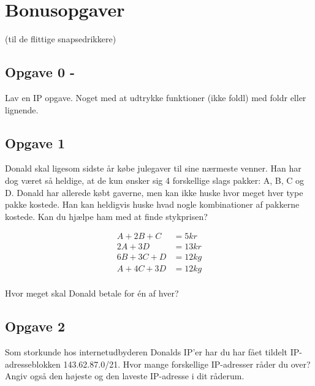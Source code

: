 \section{\huge{Bonusopgaver}}
(til de flittige snapsedrikkere)


\subsection{Opgave 0 - \color{red}{TODO!}}

Lav en IP opgave. Noget med at udtrykke funktioner (ikke foldl) med foldr
eller lignende.



\subsection{Opgave 1}
Donald skal ligesom sidste år købe julegaver til sine nærmeste venner.
Han har dog været så heldige, at de kun ønsker sig 4 forskellige slags pakker:
A, B, C og D. Donald har allerede købt gaverne, men kan ikke huske hvor meget
hver type pakke kostede. Han kan heldigvis huske hvad nogle kombinationer
af pakkerne kostede. Kan du hjælpe ham med at finde stykprisen?

\begin{align*}
A + 2B + C &= 5kr \\
2A + 3D &= 13kr \\
6B + 3C + D &= 12kg \\
A + 4C + 3D &= 12kg \\
\end{align*}

Hvor meget skal Donald betale for én af hver?



\subsection{Opgave 2}
Som storkunde hos internetudbyderen Donalds IP'er har du har fået tildelt
IP-adresseblokken 143.62.87.0/21. Hvor mange forskellige IP-adresser råder du
over? Angiv også den højeste og den laveste IP-adresse i dit råderum.

